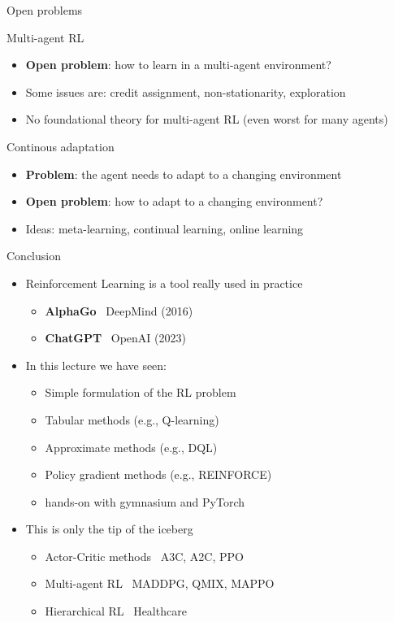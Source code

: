 \documentclass[presentation, 9pt]{beamer}\mode<presentation>{\usetheme{AMSBolognaFC}}
\begin{document}
\begin{frame}[allowframebreaks]{Open problems}
\begin{exampleblock}{Multi-agent RL}
\begin{itemize}
			\item \textbf{Open problem}: how to learn in a multi-agent environment?
			\item Some issues are: credit assignment, non-stationarity, exploration
			\item No foundational theory for multi-agent RL (even worst for many agents)
		\end{itemize}
	\end{exampleblock}
	\begin{exampleblock}{Continous adaptation}
		\begin{itemize}
			\item \textbf{Problem}: the agent needs to adapt to a changing environment
			\item \textbf{Open problem}: how to adapt to a changing environment?
			\item Ideas: meta-learning, continual learning, online learning
		\end{itemize}
	\end{exampleblock}
\end{frame} 
\begin{frame}{Conclusion}
	\begin{itemize}
		\item Reinforcement Learning is a tool really used in practice
		\begin{itemize}
			\item \textbf{AlphaGo} \faArrowRight \, DeepMind (2016)
			\item \textbf{ChatGPT} \faArrowRight \, OpenAI (2023)
		\end{itemize}
		\item In this lecture we have seen:
		\begin{itemize}
			\item Simple formulation of the RL problem
			\item Tabular methods (e.g., Q-learning)
			\item Approximate methods (e.g., DQL)
			\item Policy gradient methods (e.g., REINFORCE)
			\item hands-on with gymnasium and PyTorch
		\end{itemize}
		\item This is only the tip of the iceberg
		\begin{itemize}
			\item Actor-Critic methods \faArrowRight \, A3C, A2C, PPO
			\item Multi-agent RL \faArrowRight \, MADDPG, QMIX, MAPPO
			\item Hierarchical RL \faArrowRight \, Healthcare
		\end{itemize}
	\end{itemize}
\end{frame}
\end{document}
